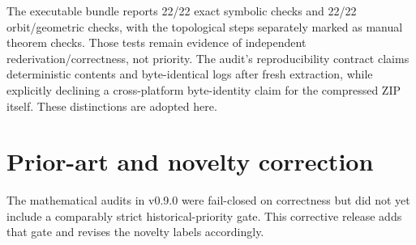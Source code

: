 \documentclass[11pt,a4paper]{article}
\begin{document}
The executable bundle reports 22/22 exact symbolic checks and 22/22 orbit/geometric checks, with the topological steps separately marked as manual theorem checks.  Those tests remain evidence of independent rederivation/correctness, not priority.  The audit's reproducibility contract claims deterministic contents and byte-identical logs after fresh extraction, while explicitly declining a cross-platform byte-identity claim for the compressed ZIP itself.  These distinctions are adopted here.


\section{Prior-art and novelty correction}
\label{sec:prior-art-v091}
The mathematical audits in v0.9.0 were fail-closed on correctness but did not yet include a comparably strict historical-priority gate.  This corrective release adds that gate and revises the novelty labels accordingly.
\end{document}
